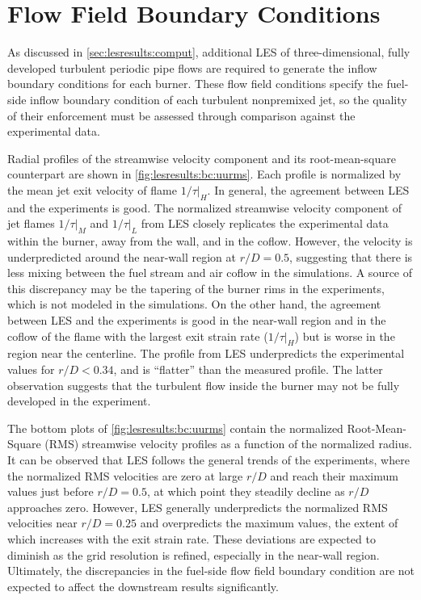 \section{Flow Field Boundary Conditions}
\label{sec:lesresults:bc}

As discussed in \cref{sec:lesresults:comput}, additional LES of three-dimensional, fully developed turbulent periodic pipe flows are required to generate the inflow boundary conditions for each burner. These flow field conditions specify the fuel-side inflow boundary condition of each turbulent nonpremixed jet, so the quality of their enforcement must be assessed through comparison against the experimental data. 

Radial profiles of the streamwise velocity component and its root-mean-square counterpart are shown in \cref{fig:lesresults:bc:uurms}. Each profile is normalized by the mean jet exit velocity of flame $1/\tau|_H$. In general, the agreement between LES and the experiments is good. The normalized streamwise velocity component of jet flames $1/\tau|_M$ and $1/\tau|_L$ from LES closely replicates the experimental data within the burner, away from the wall, and in the coflow. However, the velocity is underpredicted around the near-wall region at $r/D = 0.5$, suggesting that there is less mixing between the fuel stream and air coflow in the simulations. A source of this discrepancy may be the tapering of the burner rims in the experiments, which is not modeled in the simulations. On the other hand, the agreement between LES and the experiments is good in the near-wall region and in the coflow of the flame with the largest exit strain rate ($1/\tau|_H$) but is worse in the region near the centerline. The profile from LES underpredicts the experimental values for $r/D < 0.34$, and is ``flatter'' than the measured profile. The latter observation suggests that the turbulent flow inside the burner may not be fully developed in the experiment.

The bottom plots of \cref{fig:lesresults:bc:uurms} contain the normalized Root-Mean-Square (RMS) streamwise velocity profiles as a function of the normalized radius. It can be observed that LES follows the general trends of the experiments, where the normalized RMS velocities are zero at large $r/D$ and reach their maximum values just before $r/D = 0.5$, at which point they steadily decline as $r/D$ approaches zero. However, LES generally underpredicts the normalized RMS velocities near $r/D = 0.25$ and overpredicts the maximum values, the extent of which increases with the exit strain rate. These deviations are expected to diminish as the grid resolution is refined, especially in the near-wall region. Ultimately, the discrepancies in the fuel-side flow field boundary condition are not expected to affect the downstream results significantly.

